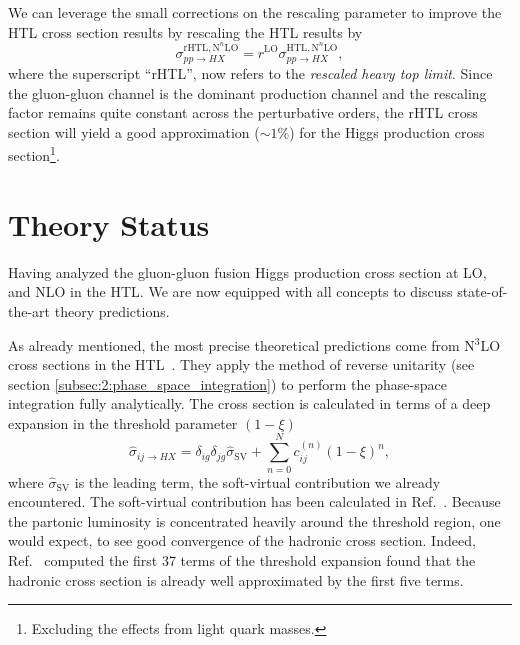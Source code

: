 We can leverage the small corrections on the rescaling parameter to improve the \acs{HTL} cross section results by rescaling the \acs{HTL} results by
\begin{equation}
\sigma_{pp \rightarrow HX}^{\mathrm{rHTL}, \mathrm{N}^n\mathrm{LO}} = r^{\mathrm{LO}} \sigma_{pp \rightarrow HX}^{\mathrm{HTL}, \mathrm{N}^n\mathrm{LO}},
\end{equation}
where the superscript ``\acs{rHTL}'', now refers to the \textit{rescaled heavy top limit}. Since the gluon-gluon channel is the dominant production channel and the rescaling factor remains quite constant across the perturbative orders, the \acs{rHTL} cross section will yield a good approximation ($\sim 1 \%$) for the Higgs production cross section\footnote{Excluding the effects from light quark masses.}.




\section{Theory Status} \label{sec:4:theory_status}
Having analyzed the gluon-gluon fusion Higgs production cross section at \acs{LO}, and \acs{NLO} in the \acs{HTL}. We are now equipped with all concepts to discuss state-of-the-art theory predictions.

As already mentioned, the most precise theoretical predictions come from N${}^3$LO cross sections in the \acs{HTL}~\cite{Anastasiou:2015vya, Anastasiou:2016cez}. They apply the method of reverse unitarity (see section \ref{subsec:2:phase_space_integration}) to perform the phase-space integration fully analytically. The cross section is calculated in terms of a deep expansion in the threshold parameter $(1 - \xi)$
\begin{equation}
\hat{\sigma}_{ij \rightarrow HX} = \delta_{ig} \delta_{jg} \hat{\sigma}_{\mathrm{SV}} + \sum_{n = 0}^N c_{ij}^{(n)} (1 - \xi)^n,
\label{eq:4:threshold_expansion}
\end{equation}
where $\hat{\sigma}_{\mathrm{SV}}$ is the leading term, the soft-virtual contribution we already encountered. The soft-virtual contribution has been calculated in Ref.~\cite{Anastasiou:2014vaa}. Because the partonic luminosity is concentrated heavily around the threshold region, one would expect, to see good convergence of the hadronic cross section. Indeed, Ref.~\cite{Anastasiou:2015vya} computed the first 37 terms of the threshold expansion found that the hadronic cross section is already well approximated by the first five terms.

